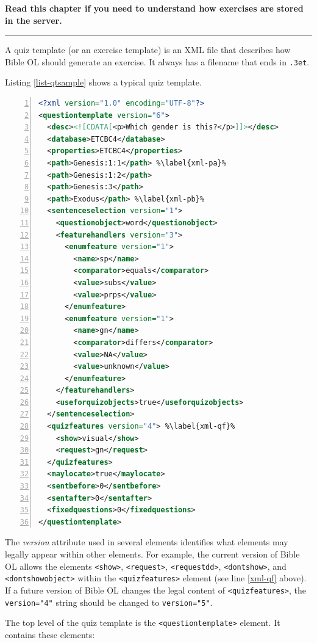 \documentclass[11pt,oneside,a4paper]{memoir}
\newcommand*{\xml}[1]{\texttt{<#1>}}
\newcommand*{\xmla}[1]{\texttt{#1}} %
\begin{document}
\textbf{Read this chapter if you need to understand how exercises are stored in the server.}
\plainbreak{3}


A quiz template (or an exercise template) is an XML
file that describes how Bible OL should generate an exercise. It always has a filename that ends in
\texttt{.3et}.

Listing \ref{list-qtsample} shows a typical quiz template.

\begin{lstlisting}[language=XML,numbers=left,caption=Quiz template sample,label=list-qtsample]
<?xml version="1.0" encoding="UTF-8"?>
<questiontemplate version="6">
  <desc><![CDATA[<p>Which gender is this?</p>]]></desc>
  <database>ETCBC4</database>
  <properties>ETCBC4</properties>
  <path>Genesis:1:1</path> %\label{xml-pa}%
  <path>Genesis:1:2</path>
  <path>Genesis:3</path>
  <path>Exodus</path> %\label{xml-pb}%
  <sentenceselection version="1">
    <questionobject>word</questionobject>
    <featurehandlers version="3">
      <enumfeature version="1">
        <name>sp</name>
        <comparator>equals</comparator>
        <value>subs</value>
        <value>prps</value>
      </enumfeature>
      <enumfeature version="1">
        <name>gn</name>
        <comparator>differs</comparator>
        <value>NA</value>
        <value>unknown</value>
      </enumfeature>
    </featurehandlers>
    <useforquizobjects>true</useforquizobjects>
  </sentenceselection>
  <quizfeatures version="4"> %\label{xml-qf}%
    <show>visual</show>
    <request>gn</request>
  </quizfeatures>
  <maylocate>true</maylocate>
  <sentbefore>0</sentbefore>
  <sentafter>0</sentafter>
  <fixedquestions>0</fixedquestions>
</questiontemplate>
\end{lstlisting}

The \emph{version} attribute used in several elements identifies what elements may legally appear
within other elements. For example, the current version of Bible OL allows the elements \xml{show},
\xml{request}, \xml{requestdd}, \xml{dontshow}, and \xml{dontshowobject} within the \xml{quizfeatures} element (see line
\ref{xml-qf} above). If a future version of Bible OL changes the legal content of
\xml{quizfeatures}, the \xmla{version="4"} string should be changed to \xmla{version="5"}.


The top level of the quiz template is the \xml{questiontemplate} element. It contains these
elements:
\end{document}
